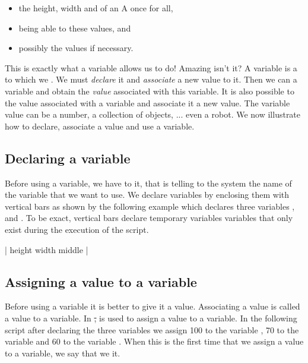 \begin{itemize}
\item {} the height, width and \dist of an A once for all, 
\item being able to  these values, and 
\item possibly  the values if necessary. 
\end{itemize}

This is exactly what a variable allows us to do! Amazing isn't it? A variable is a  to which we . We must \emph{declare} it and  \emph{associate} a new value to it. Then we can  a variable and obtain the \emph{value} associated with this variable. It is also possible to  the value associated with a variable and associate it a new value. The variable value can be a number, a collection of objects, ... even a robot. We now illustrate how to declare, associate a value and use a variable.


\subsection*{Declaring a variable}
Before using a variable, we have to  it, that is telling to the system the name of the variable that we want to use. We declare variables by enclosing them with vertical bars \ct{||} as shown by the following example which declares three variables ,  and \ct{\dist}.  To be exact, vertical bars \ct{||} declare temporary variables \ie variables that only exist during the execution of the script.

\begin{nalltt}
| height width middle |
\end{nalltt}



\subsection*{Assigning a value to a variable}
Before using a variable it is better to give it a value. Associating a value is called  a value to a variable. In \st, \ct{:=} is used to assign a value to a variable. In the following script after declaring the three variables we assign 100 to 
the variable , 70 to the variable  and 60 to the variable \ct{\dist}.
When this is the first time that we assign a value to a variable, we say that we  it.

